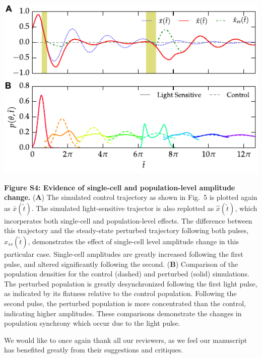\documentclass[11pt, letterpaper]{article}
\newenvironment{manuscript}[1]{\begin{center}\begin{tcolorbox}[colback=green!5!white,colframe=green!75!black,width=0.8\textwidth,title={#1},breakable,fonttitle=\bfseries]}{\end{tcolorbox}\end{center}}
\begin{document}
\begin{manuscript}{Supplemental Info, Page 7}
  \begin{center}
    \includegraphics[width=.85\textwidth]{figures/figure_S4.pdf}\\
  \end{center}
{\bfseries Figure S4: Evidence of single-cell and population-level amplitude change.}
({\bfseries A}) The simulated control trajectory as shown in Fig.~5 is plotted again as $\bar{x}(\tilde{t})$.
The simulated light-sensitive trajector is also replotted as $\hat{x}(\tilde{t})$, which incorperates both single-cell and population-level effects.
The difference between this trajectory and the steady-state perturbed trajectory following both pulses, $\hat{x}_{ss}(\tilde{t})$, demonstrates the effect of single-cell level amplitude change in this particular case. 
Single-cell amplitudes are greatly increased following the first pulse, and altered significantly following the second.
({\bfseries B})
Comparison of the population densities for the control (dashed) and perturbed (solid) simulations.
The perturbed population is greatly desynchronized following the first light pulse, as indicated by its flatness relative to the control population. 
Following the second pulse, the perturbed population is more concentrated than the control, indicating higher amplitudes. 
These comparisons demonstrate the changes in population synchrony which occur due to the light pulse. 
\end{manuscript}

We would like to once again thank all our reviewers, as we feel our manuscript has benefited greatly from their suggestions and critiques.
\end{document}
